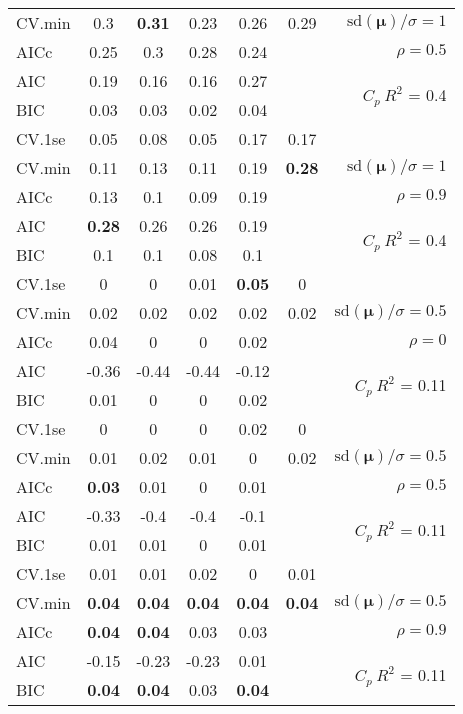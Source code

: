 \documentclass[12pt]{article}
\newcommand{\mr}[1]{\mathrm{#1}}
\newcommand{\bm}[1]{\mathbf{#1}}
\begin{document}
\begin{table}[p]
\begin{center}
\begin{tabular}{l*{5}{c}|r}
CV.min & 0.3 & {\bf 0.31} & 0.23 & 0.26 & 0.29 &  $\mr{sd}(\bm{\mu})/\sigma=1$ \\
AICc & 0.25 & 0.3 & 0.28 & 0.24 & & $\rho=0.5$ \\
AIC & 0.19 & 0.16 & 0.16 & 0.27 & & \multirow{2}{*}{$C_p ~ R^2$ = 0.4} \\
BIC & 0.03 & 0.03 & 0.02 & 0.04 & & \\
 \hline 
CV.1se & 0.05 & 0.08 & 0.05 & 0.17 & 0.17 &\\
CV.min & 0.11 & 0.13 & 0.11 & 0.19 & {\bf 0.28} &  $\mr{sd}(\bm{\mu})/\sigma=1$ \\
AICc & 0.13 & 0.1 & 0.09 & 0.19 & & $\rho=0.9$ \\
AIC & {\bf 0.28} & 0.26 & 0.26 & 0.19 & & \multirow{2}{*}{$C_p ~ R^2$ = 0.4} \\
BIC & 0.1 & 0.1 & 0.08 & 0.1 & & \\
 \hline 
CV.1se & 0 & 0 & 0.01 & {\bf 0.05} & 0 &\\
CV.min & 0.02 & 0.02 & 0.02 & 0.02 & 0.02 &  $\mr{sd}(\bm{\mu})/\sigma=0.5$ \\
AICc & 0.04 & 0 & 0 & 0.02 & & $\rho=0$ \\
AIC & -0.36 & -0.44 & -0.44 & -0.12 & & \multirow{2}{*}{$C_p ~ R^2$ = 0.11} \\
BIC & 0.01 & 0 & 0 & 0.02 & & \\
 \hline 
CV.1se & 0 & 0 & 0 & 0.02 & 0 &\\
CV.min & 0.01 & 0.02 & 0.01 & 0 & 0.02 &  $\mr{sd}(\bm{\mu})/\sigma=0.5$ \\
AICc & {\bf 0.03} & 0.01 & 0 & 0.01 & & $\rho=0.5$ \\
AIC & -0.33 & -0.4 & -0.4 & -0.1 & & \multirow{2}{*}{$C_p ~ R^2$ = 0.11} \\
BIC & 0.01 & 0.01 & 0 & 0.01 & & \\
 \hline 
CV.1se & 0.01 & 0.01 & 0.02 & 0 & 0.01 &\\
CV.min & {\bf 0.04} & {\bf 0.04} & {\bf 0.04} & {\bf 0.04} & {\bf 0.04} &  $\mr{sd}(\bm{\mu})/\sigma=0.5$ \\
AICc & {\bf 0.04} & {\bf 0.04} & 0.03 & 0.03 & & $\rho=0.9$ \\
AIC & -0.15 & -0.23 & -0.23 & 0.01 & & \multirow{2}{*}{$C_p ~ R^2$ = 0.11} \\
BIC & {\bf 0.04} & {\bf 0.04} & 0.03 & {\bf 0.04} & & \\
 \hline 
\end{tabular}
\end{center}
\vspace{-1cm}
\end{table}
\end{document}
